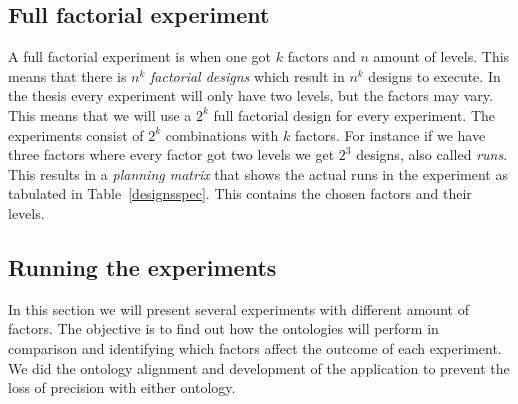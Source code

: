 \documentclass{llncs}
\begin{document}
\subsection{Full factorial experiment}
A full factorial experiment is when one got $k$ factors and $n$ amount
of levels. This means that there is $n^k$ \emph{factorial designs}
which result in $n^k$ designs to execute.  In the thesis every
experiment will only have two levels, but the factors may vary. This
means that we will use a $2^k$ full factorial design for every
experiment. The experiments consist of $2^k$ combinations with $k$
factors. For instance if we have three factors where every factor got
two levels we get $2^3$ designs, also called \emph{runs}. This results
in a \emph{planning matrix} that shows the actual runs in the
experiment as tabulated in Table~\ref{designsspec}. This contains the
chosen factors and their levels.




\subsection{Running the experiments}
In this section we will present several experiments with different
amount of factors.  The objective is to find out how the ontologies
will perform in comparison and identifying which factors affect the
outcome of each experiment. We did the ontology alignment and
development of the application to prevent the loss of precision with
either ontology.
\end{document}
